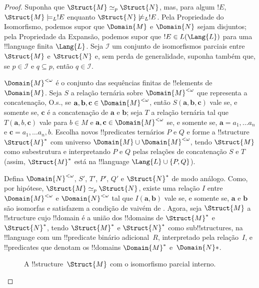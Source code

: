 \documentclass[../../../include/open-logic-section]{subfiles}
\begin{document}
\begin{proof}
Suponha que $\Struct{M} \simeq_p \Struct{N}$, mas, para algum $!E$,
$\Struct{M} \models_L !E$ enquanto $\Struct{N} \not\models_L !E$. Pela
Propriedade do Isomorfismo, podemos supor que $\Domain{M}$ e
$\Domain{N}$ sejam disjuntos; pela Propriedade da Expansão, podemos
supor que $!E \in L(\Lang{L})$ para uma !!{language} finita
$\Lang{L}$. Seja $\mathcal{I}$ um conjunto de isomorfismos parciais
entre $\Struct{M}$ e $\Struct{N}$ e, sem perda de generalidade, suponha
também que, se $p \in \mathcal{I}$ e $q \subseteq p$, então
$q \in \mathcal{I}$.

$\Domain{M}^{<\omega}$ é o conjunto das sequências finitas de
!!{element}s de~$\Domain{M}$. Seja $S$ a relação ternária sobre
$\Domain{M}^{<\omega}$ que representa a concatenação, O.s.\@, se
$\mathbf{a}, \mathbf{b}, \mathbf{c} \in \Domain{M}^{<\omega}$, então
$S(\mathbf{a}, \mathbf{b}, \mathbf{c})$ vale se, e somente se,
$\mathbf{c}$ é a concatenação de $\mathbf{a}$ e $\mathbf{b}$; seja $T$
a relação ternária tal que $T(\mathbf{a}, b, \mathbf{c})$ vale para
$b \in M$ e $\mathbf{a}, \mathbf{c} \in \Domain{M}^{<\omega}$ se, e
somente se, $\mathbf{a} = a_1, \dots a_n$ e
$\mathbf{c} = a_1, \dots a_n, b$. Escolha novos !!{predicate}s
ternários $P$ e $Q$ e forme a !!{structure} $\Struct{M}^*$ com
universo $\Domain{M} \cup \Domain{M}^{<\omega}$, tendo $\Struct{M}$
como subestrutura e interpretando $P$ e $Q$ pelas relações de
concatenação $S$ e $T$ (assim, $\Struct{M}^*$ está na !!{language}
$\Lang{L} \cup \{ P, Q\}$).

Defina $\Domain{N}^{<\omega}$, $S'$, $T'$, $P'$, $Q'$ e
$\Struct{N}^*$ de modo análogo. Como, por hipótese,
$\Struct{M} \simeq_p \Struct{N}$, existe uma relação $I$ entre
$\Domain{M}^{<\omega}$ e $\Domain{N}^{<\omega}$ tal que
$I(\mathbf{a}, \mathbf{b})$ vale se, e somente se, $\mathbf{a}$ e
$\mathbf{b}$ são isomorfas e satisfazem a condição de vaivém de
. Agora, seja $\Struct{M}$ a
!!{structure} cujo !!{domain} é a união dos !!{domain}s de
$\Struct{M}^*$ e $\Struct{N}^*$, tendo $\Struct{M}^*$ e $\Struct{N}^*$
como sub!!{structure}s, na !!{language} com um !!{predicate} binário
adicional~$R$, interpretado pela relação~$I$, e !!{predicate}s que
denotam os !!{domain}s $\Domain{M}^*$ e~$\Domain{N}*$.

\begin{figure}[h]
  \centering
  \caption{A !!{structure}~$\Struct{M}$ com o isomorfismo parcial
    interno.}
\end{figure}


\end{proof}
\end{document}
